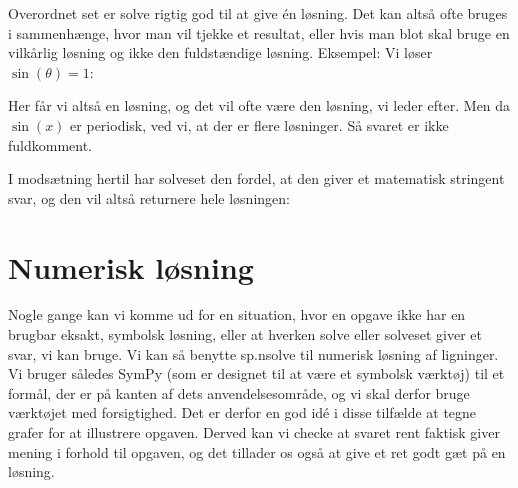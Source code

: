 \documentclass[letterpaper,10pt,english]{jupyterBook}
\begin{document}
\noindent{}

\noindent{}

Overordnet set er solve rigtig god til at give én løsning. Det kan altså ofte bruges i sammenhænge, hvor man vil tjekke et resultat, eller hvis man blot skal bruge en vilkårlig løsning og ikke den fuldstændige løsning.
Eksempel: Vi løser \(\sin(\theta) = 1\):

\begin{sphinxVerbatim}[commandchars=\\\{\}]
  
\end{sphinxVerbatim}

\noindent{}

Her får vi altså en løsning, og det vil ofte være den løsning, vi leder efter. Men da \(\sin(x)\) er periodisk, ved vi, at der er flere løsninger. Så svaret er ikke fuldkomment.

I modsætning hertil har solveset den fordel, at den giver et  matematisk stringent svar, og den vil altså returnere hele løsningen:

\begin{sphinxVerbatim}[commandchars=\\\{\}]
  
\end{sphinxVerbatim}

\noindent{}


\section{Numerisk løsning}
\label{\detokenize{notebooks/sympy/Notebook3_ligninger:numerisk-losning}}
Nogle gange kan vi komme ud for en situation, hvor en opgave ikke har en brugbar eksakt, symbolsk løsning, eller at hverken solve eller solveset giver et svar, vi kan bruge. Vi kan så benytte sp.nsolve til numerisk løsning af ligninger. Vi bruger således SymPy (som er designet til at være et symbolsk værktøj) til et formål, der er på kanten af dets anvendelsesområde, og vi skal derfor bruge værktøjet med forsigtighed. Det er derfor en god idé i disse tilfælde at tegne grafer for at illustrere opgaven. Derved kan vi checke at svaret rent faktisk giver mening i forhold til opgaven, og det tillader os også at give et ret godt gæt på en løsning.
\end{document}
